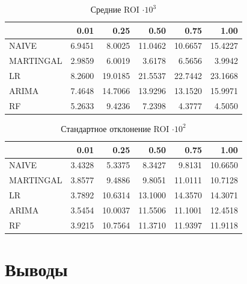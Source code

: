\documentclass{beamer}
\begin{document}
\begin{frame}
    \begin{table}[H]
        \caption{Средние ROI $\cdot 10^3$}
        \label{tab:roi_mean}
        \begin{tabular}{lrrrrr}
            \toprule
            &  0.01 &  0.25 &  0.50 &  0.75 &  1.00 \\
            \midrule
            NAIVE & 6.9451 & 8.0025 & 11.0462 & 10.6657 & 15.4227 \\
            MARTINGAL & 2.9859 & 6.0019 & 3.6178 & 6.5656 & 3.9942 \\
            LR & 8.2600 & 19.0185 & 21.5537 & 22.7442 & 23.1668 \\
            ARIMA & 7.4648 & 14.7066 & 13.9296 & 13.1520 & 15.9971 \\
            RF & 5.2633 & 9.4236 & 7.2398 & 4.3777 & 4.5050 \\
            \bottomrule
        \end{tabular}
    \end{table}
\end{frame}

\begin{frame}
    \begin{table}[H]
        \caption{Стандартное отклонение ROI $\cdot 10^2$}
        \label{tab:roi_std}
        \begin{tabular}{lrrrrr}
            \toprule
            &  0.01 &  0.25 &  0.50 &  0.75 &  1.00 \\
            \midrule
            NAIVE & 3.4328 & 5.3375 & 8.3427 & 9.8131 & 10.6650 \\
            MARTINGAL & 3.8577 & 9.4886 & 9.8051 & 11.0111 & 10.7128 \\
            LR & 3.7892 & 10.6314 & 13.1000 & 14.3570 & 14.3071 \\
            ARIMA & 3.5454 & 10.0037 & 11.5506 & 11.1001 & 12.4518 \\
            RF & 3.9215 & 10.7564 & 11.3710 & 11.9397 & 11.9118 \\
            \bottomrule
        \end{tabular}
    \end{table}
\end{frame}

\section{Выводы}
\end{document}
